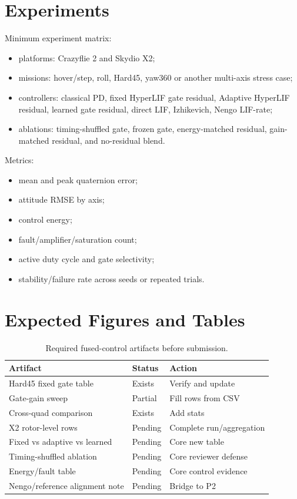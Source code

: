 \documentclass[journal]{IEEEtran}
\begin{document}
\section{Experiments}
Minimum experiment matrix:
\begin{itemize}
  \item platforms: Crazyflie 2 and Skydio X2;
  \item missions: hover/step, roll, Hard45, yaw360 or another multi-axis stress case;
  \item controllers: classical PD, fixed HyperLIF gate residual, Adaptive HyperLIF residual, learned gate residual, direct LIF, Izhikevich, Nengo LIF-rate;
  \item ablations: timing-shuffled gate, frozen gate, energy-matched residual, gain-matched residual, and no-residual blend.
\end{itemize}

Metrics:
\begin{itemize}
  \item mean and peak quaternion error;
  \item attitude RMSE by axis;
  \item control energy;
  \item fault/amplifier/saturation count;
  \item active duty cycle and gate selectivity;
  \item stability/failure rate across seeds or repeated trials.
\end{itemize}

\section{Expected Figures and Tables}
\begin{table}[t]
\centering
\caption{Required fused-control artifacts before submission.}
\begin{tabular}{lll}
\toprule
Artifact & Status & Action \\
\midrule
Hard45 fixed gate table & Exists & Verify and update \\
Gate-gain sweep & Partial & Fill rows from CSV \\
Cross-quad comparison & Exists & Add stats \\
X2 rotor-level rows & Pending & Complete run/aggregation \\
Fixed vs adaptive vs learned & Pending & Core new table \\
Timing-shuffled ablation & Pending & Core reviewer defense \\
Energy/fault table & Pending & Core control evidence \\
Nengo/reference alignment note & Pending & Bridge to P2 \\
\bottomrule
\end{tabular}
\end{table}
\end{document}
